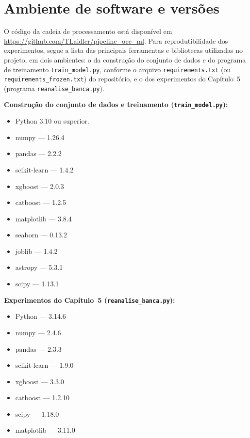 \chapter{Ambiente de software e versões}
\label{ap:ambiente}

O código da cadeia de processamento está disponível em \url{https://github.com/TLaidler/pipeline_occ_ml}. Para reprodutibilidade dos experimentos, segue a lista das principais ferramentas e bibliotecas utilizadas no projeto, em dois ambientes: o da construção do conjunto de dados e do programa de treinamento \texttt{train\_model.py}, conforme o arquivo \texttt{requirements.txt} (ou \texttt{requirements\_frozen.txt}) do repositório, e o dos experimentos do Capítulo~5 (programa \texttt{reanalise\_banca.py}).

\textbf{Construção do conjunto de dados e treinamento (\texttt{train\_model.py}):}
\begin{itemize}
	\item Python 3.10 ou superior.
	\item numpy --- 1.26.4
	\item pandas --- 2.2.2
	\item scikit-learn --- 1.4.2
	\item xgboost --- 2.0.3
	\item catboost --- 1.2.5
	\item matplotlib --- 3.8.4
	\item seaborn --- 0.13.2
	\item joblib --- 1.4.2
	\item astropy --- 5.3.1
	\item scipy --- 1.13.1
\end{itemize}

\textbf{Experimentos do Capítulo~5 (\texttt{reanalise\_banca.py}):}
\begin{itemize}
	\item Python --- 3.14.6
	\item numpy --- 2.4.6
	\item pandas --- 2.3.3
	\item scikit-learn --- 1.9.0
	\item xgboost --- 3.3.0
	\item catboost --- 1.2.10
	\item scipy --- 1.18.0
	\item matplotlib --- 3.11.0
\end{itemize}

